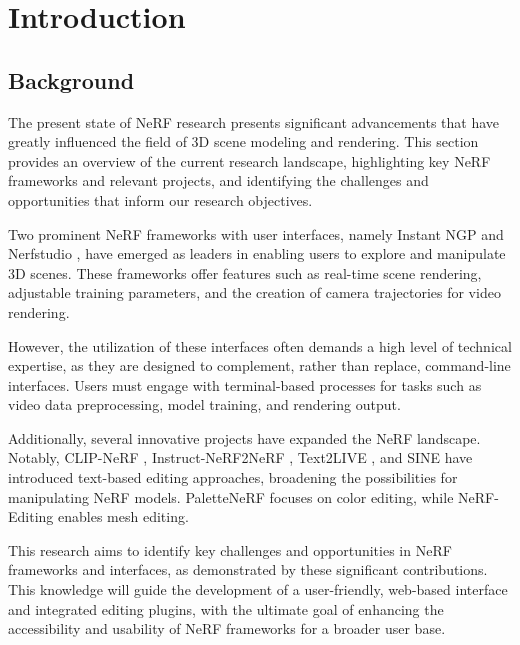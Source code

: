 %
\chapter{Introduction}
\label{sec:intro}

\section{Background}
\label{sec:intro:background}

The present state of NeRF research presents significant advancements that have greatly influenced the field of 3D scene modeling and rendering. This section provides an overview of the current research landscape, highlighting key NeRF frameworks and relevant projects, and identifying the challenges and opportunities that inform our research objectives.

Two prominent NeRF frameworks with user interfaces, namely Instant NGP \cite{muller_instant_2022} and Nerfstudio \cite{tancik_nerfstudio_2023}, have emerged as leaders in enabling users to explore and manipulate 3D scenes. These frameworks offer features such as real-time scene rendering, adjustable training parameters, and the creation of camera trajectories for video rendering.

However, the utilization of these interfaces often demands a high level of technical expertise, as they are designed to complement, rather than replace, command-line interfaces. Users must engage with terminal-based processes for tasks such as video data preprocessing, model training, and rendering output.

Additionally, several innovative projects have expanded the NeRF landscape. Notably, CLIP-NeRF \cite{wang_clip-nerf_2022}, Instruct-NeRF2NeRF \cite{haque_instruct-nerf2nerf_2023}, Text2LIVE \cite{bar-tal_text2live_2022}, and SINE \cite{bao_sine_2023} have introduced text-based editing approaches, broadening the possibilities for manipulating NeRF models. PaletteNeRF \cite{wu_palettenerf_2022} focuses on color editing, while NeRF-Editing \cite{yuan_nerf-editing_2022} enables mesh editing. 

This research aims to identify key challenges and opportunities in NeRF frameworks and interfaces, as demonstrated by these significant contributions. This knowledge will guide the development of a user-friendly, web-based interface and integrated editing plugins, with the ultimate goal of enhancing the accessibility and usability of NeRF frameworks for a broader user base.


